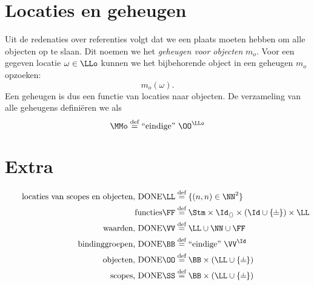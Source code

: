 \section{Locaties en geheugen}
\label{sec:locaties}

Uit de redenaties over referenties volgt dat we een plaats moeten hebben om alle objecten op te slaan. Dit noemen we het \emph{geheugen voor objecten} $m_o$. Voor een gegeven locatie $\omega\in\LLo$ kunnen we het bijbehorende object in een geheugen $m_o$ opzoeken:
%
\begin{equation*}
  m_o(\omega).
\end{equation*}
%
Een geheugen is dus een functie van locaties naar objecten. De verzameling van alle geheugens definiëren we als
%
\begin{equation*}
  \MMo \DEF \FiniteFunctions{\OO}{\LLo}
\end{equation*}

\section*{Extra}

\begin{align*}
  \tag*{locaties van scopes en objecten, DONE}
  \LL &\DEF \{ (n, n) \in \NN^2 \} \\
  \tag*{functies}
  \FF &\DEF \Stm \times \Id_{\langle\rangle} \times (\Id \cup \{\nil\}) \times \LL \\
  \tag*{waarden, DONE}
  \VV &\DEF \LL \cup \NN \cup \FF \\
  \tag*{bindinggroepen, DONE}
  \BB &\DEF \FiniteFunctions{\VV}{\Id} \\
  \tag*{objecten, DONE}
  \OO &\DEF \BB \times (\LL \cup \{\nil\}) \\
  \tag*{scopes, DONE}
  \SS &\DEF \BB \times (\LL \cup \{\nil\}) \\
\end{align*}


